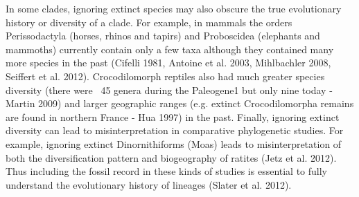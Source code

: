 In some clades, ignoring extinct species may also obscure the true evolutionary history or diversity of a clade. For example, in mammals the orders Perissodactyla (horses, rhinos and tapirs) and Proboscidea (elephants and mammoths) currently contain only a few taxa although they contained many more species in the past (Cifelli 1981, Antoine et al. 2003, Mihlbachler 2008, Seiffert et al. 2012). Crocodilomorph reptiles also had much greater species diversity (there were ~45 genera during the Paleogene1 but only nine today - Martin 2009) and larger geographic ranges (e.g. extinct Crocodilomorpha remains are found in northern France - Hua 1997) in the past. Finally, ignoring extinct diversity can lead to misinterpretation in comparative phylogenetic studies. For example, ignoring extinct Dinornithiforms (Moas) leads to misinterpretation of both the diversification pattern and biogeography of ratites (Jetz et al. 2012). Thus including the fossil record in these kinds of studies is essential to fully understand the evolutionary history of lineages (Slater et al. 2012).





